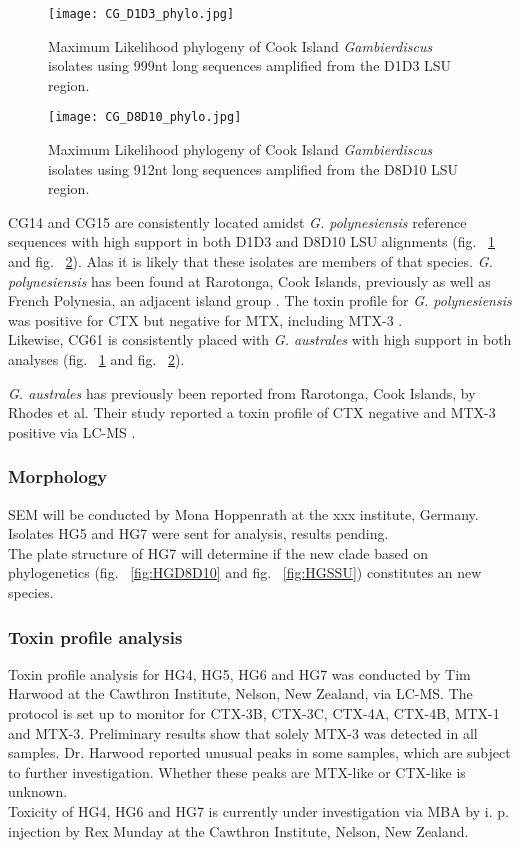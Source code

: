 \documentclass[12pt]{article}
\begin{document}
\begin{figure} 
\texttt{[image: CG\_D1D3\_phylo.jpg]} 
\caption{Maximum Likelihood phylogeny of Cook Island \textit{Gambierdiscus} isolates using 999nt long sequences amplified from the D1D3 LSU region.} 
\label{fig:CGD1D3}
\end{figure} 
\FloatBarrier 
\newpage

\begin{figure} 
\texttt{[image: CG\_D8D10\_phylo.jpg]} 
\caption{Maximum Likelihood phylogeny of Cook Island \textit{Gambierdiscus} isolates using 912nt long sequences amplified from the D8D10 LSU region.} 
\label{fig:CGD8D0}
\end{figure} 
\FloatBarrier 

CG14 and CG15 are consistently located amidst \emph{G. polynesiensis} reference sequences with high support in both D1D3 and D8D10 LSU alignments (fig. ~\ref{fig:CGD1D3} and fig. ~\ref{fig:CGD8D0}). Alas it is likely that these isolates are members of that species.
\emph{G. polynesiensis} has been found at Rarotonga, Cook Islands, previously \cite{rhodes2014production} as well as French Polynesia, an adjacent island group \cite{chinain1999morphology}. The toxin profile for \emph{G. polynesiensis} was positive for CTX \cite{chinain2010growth,rhodes2014production} but negative for MTX, including MTX-3 \cite{rhodes2014production}.
\\
Likewise, CG61 is consistently placed with \emph{G. australes} with high support in both analyses (fig. ~\ref{fig:CGD1D3} and fig. ~\ref{fig:CGD8D0}).

\emph{G. australes} has previously been reported from Rarotonga, Cook Islands, by Rhodes et al. Their study reported a toxin profile of CTX negative and MTX-3 positive via LC-MS \cite{rhodes2014production}.

\subsubsection{Morphology}
SEM will be conducted by Mona Hoppenrath at the xxx institute, Germany. Isolates HG5 and HG7 were sent for analysis, results pending.\\
The plate structure of HG7 will determine if the new clade based on phylogenetics (fig. ~\ref{fig:HGD8D10} and fig. ~\ref{fig:HGSSU}) constitutes an new species.


\subsubsection{Toxin profile analysis}
Toxin profile analysis for HG4, HG5, HG6 and HG7 was conducted by Tim Harwood at the Cawthron Institute, Nelson, New Zealand, via LC-MS. The protocol is set up to monitor for CTX-3B, CTX-3C, CTX-4A, CTX-4B, MTX-1 and MTX-3. Preliminary results show that solely MTX-3 was detected in all samples. Dr. Harwood reported unusual peaks in some samples, which are subject to further investigation. Whether these peaks are MTX-like or CTX-like is unknown.\\
Toxicity of HG4, HG6 and HG7 is currently under investigation via MBA by i. p. injection by Rex Munday at the Cawthron Institute, Nelson, New Zealand.\\
\end{document}
